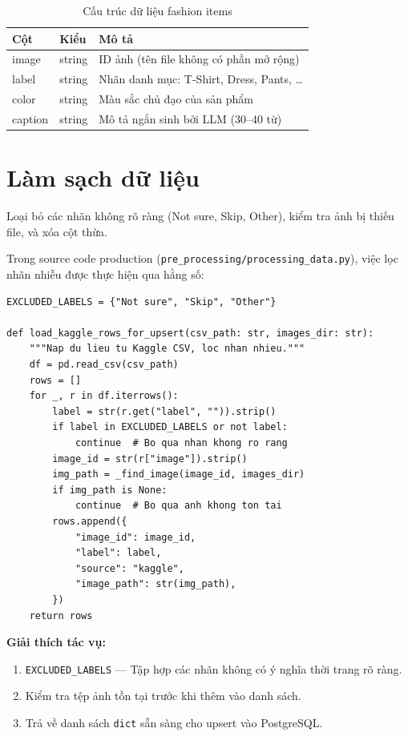 \documentclass[12pt,a4paper]{report}
\begin{document}
\begin{table}[H]
\centering
\begin{tabular}{lll}
\toprule
\textbf{Cột} & \textbf{Kiểu} & \textbf{Mô tả}\\
\midrule
image & string & ID ảnh (tên file không có phần mở rộng)\\
label & string & Nhãn danh mục: T-Shirt, Dress, Pants, \ldots\\
color & string & Màu sắc chủ đạo của sản phẩm\\
caption & string & Mô tả ngắn sinh bởi LLM (30--40 từ)\\
\bottomrule
\end{tabular}
\caption{Cấu trúc dữ liệu fashion items}
\end{table}

\section{Làm sạch dữ liệu}

\begin{tcolorbox}[title=Phương pháp: Lọc nhãn nhiễu và kiểm tra toàn vẹn]
Loại bỏ các nhãn không rõ ràng (Not sure, Skip, Other), kiểm tra ảnh bị thiếu file, và xóa cột thừa.
\end{tcolorbox}

Trong source code production (\texttt{pre\_processing/processing\_data.py}), việc lọc nhãn nhiễu được thực hiện qua hằng số:

\begin{lstlisting}[caption={Lọc nhãn nhiễu --- processing\_data.py}]
EXCLUDED_LABELS = {"Not sure", "Skip", "Other"}

def load_kaggle_rows_for_upsert(csv_path: str, images_dir: str):
    """Nap du lieu tu Kaggle CSV, loc nhan nhieu."""
    df = pd.read_csv(csv_path)
    rows = []
    for _, r in df.iterrows():
        label = str(r.get("label", "")).strip()
        if label in EXCLUDED_LABELS or not label:
            continue  # Bo qua nhan khong ro rang
        image_id = str(r["image"]).strip()
        img_path = _find_image(image_id, images_dir)
        if img_path is None:
            continue  # Bo qua anh khong ton tai
        rows.append({
            "image_id": image_id,
            "label": label,
            "source": "kaggle",
            "image_path": str(img_path),
        })
    return rows
\end{lstlisting}

\textbf{Giải thích tác vụ:}
\begin{enumerate}
    \item \texttt{EXCLUDED\_LABELS} --- Tập hợp các nhãn không có ý nghĩa thời trang rõ ràng.
    \item Kiểm tra tệp ảnh tồn tại trước khi thêm vào danh sách.
    \item Trả về danh sách \texttt{dict} sẵn sàng cho upsert vào PostgreSQL.
\end{enumerate}
\end{document}
